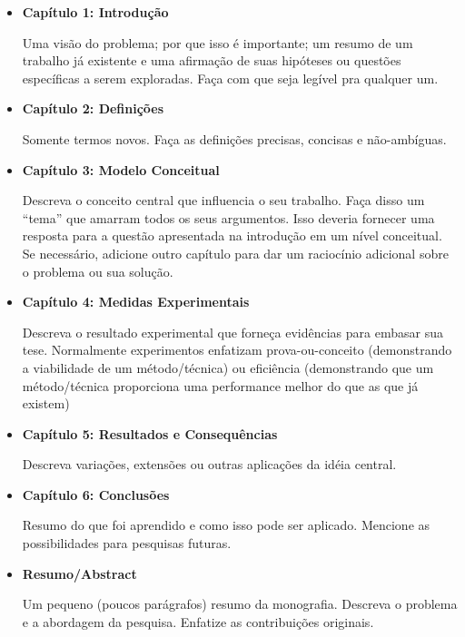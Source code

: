 \begin{itemize}
	
	\item \textbf{Cap\'{i}tulo 1: Introdu\c{c}\~{a}o}

	Uma vis\~{a}o do problema; por que isso \'{e} importante; um resumo de um trabalho j\'{a} existente e uma afirma\c{c}\~{a}o de suas hip\'{o}teses ou quest\~{o}es espec\'{i}ficas a serem exploradas. Fa\c{c}a com que seja leg\'{i}vel pra qualquer um.

	\item \textbf{Cap\'{i}tulo 2: Defini\c{c}\~{o}es}

	Somente termos novos. Fa\c{c}a as defini\c{c}\~{o}es precisas, concisas e n\~{a}o-amb\'{i}guas.

	\item \textbf{Cap\'{i}tulo 3: Modelo Conceitual}

	Descreva o conceito central que influencia o seu trabalho. Fa\c{c}a disso um ``tema'' que amarram todos os seus argumentos. Isso deveria fornecer uma resposta para a quest\~{a}o apresentada na introdu\c{c}\~{a}o em um n\'{i}vel conceitual. Se necess\'{a}rio, adicione outro cap\'{i}tulo para dar um racioc\'{i}nio adicional sobre o problema ou sua solu\c{c}\~{a}o.

	\item \textbf{Cap\'{i}tulo 4: Medidas Experimentais}

	Descreva o resultado experimental que forne\c{c}a evidências para embasar sua tese. Normalmente experimentos enfatizam prova-ou-conceito (demonstrando a viabilidade de um m\'{e}todo/t\'{e}cnica) ou eficiência (demonstrando que um m\'{e}todo/t\'{e}cnica proporciona uma performance melhor do que as que j\'{a} existem)
	
	\item \textbf{Cap\'{i}tulo 5: Resultados e Consequências}

	Descreva varia\c{c}\~{o}es, extens\~{o}es ou outras aplica\c{c}\~{o}es da id\'{e}ia central.

	\item \textbf{Cap\'{i}tulo 6: Conclus\~{o}es}

	Resumo do que foi aprendido e como isso pode ser aplicado. Mencione as possibilidades para pesquisas futuras.

	\item \textbf{Resumo/Abstract}

	Um pequeno (poucos par\'{a}grafos) resumo da monografia. Descreva o problema e a abordagem da pesquisa. Enfatize as contribui\c{c}\~{o}es originais.

\end{itemize}

